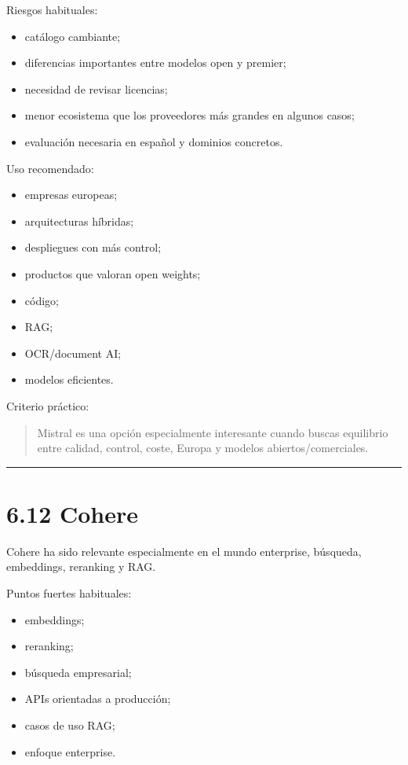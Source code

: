 Riesgos habituales:

\begin{itemize}
\tightlist
\item
  catálogo cambiante;
\item
  diferencias importantes entre modelos open y premier;
\item
  necesidad de revisar licencias;
\item
  menor ecosistema que los proveedores más grandes en algunos casos;
\item
  evaluación necesaria en español y dominios concretos.
\end{itemize}

Uso recomendado:

\begin{itemize}
\tightlist
\item
  empresas europeas;
\item
  arquitecturas híbridas;
\item
  despliegues con más control;
\item
  productos que valoran open weights;
\item
  código;
\item
  RAG;
\item
  OCR/document AI;
\item
  modelos eficientes.
\end{itemize}

Criterio práctico:

\begin{quote}
Mistral es una opción especialmente interesante cuando buscas equilibrio
entre calidad, control, coste, Europa y modelos abiertos/comerciales.
\end{quote}

\begin{center}\rule{0.5\linewidth}{0.5pt}\end{center}

\section{6.12 Cohere}\label{cohere}

Cohere ha sido relevante especialmente en el mundo enterprise, búsqueda,
embeddings, reranking y RAG.

Puntos fuertes habituales:

\begin{itemize}
\tightlist
\item
  embeddings;
\item
  reranking;
\item
  búsqueda empresarial;
\item
  APIs orientadas a producción;
\item
  casos de uso RAG;
\item
  enfoque enterprise.
\end{itemize}

